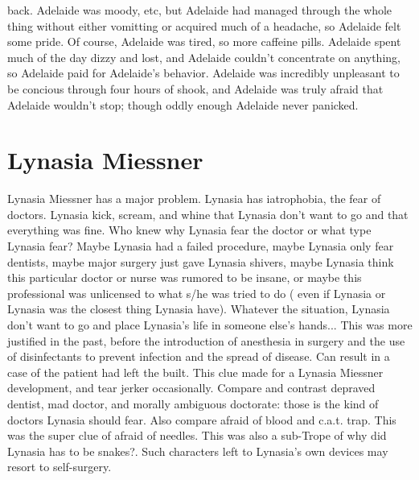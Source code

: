 \documentclass[12pt]{book}
\begin{document}
back. Adelaide was moody, etc, but Adelaide had managed through the whole thing without either vomitting or acquired much of a headache, so Adelaide felt some pride. Of course, Adelaide was tired, so more caffeine pills. Adelaide spent much of the day dizzy and lost, and Adelaide couldn't concentrate on anything, so Adelaide paid for Adelaide's behavior. Adelaide was incredibly unpleasant to be concious through four hours of shook, and Adelaide was truly afraid that Adelaide wouldn't stop; though oddly enough Adelaide never panicked.



\chapter{Lynasia Miessner}

Lynasia Miessner has a major problem. Lynasia has iatrophobia, the fear of doctors. Lynasia kick, scream, and whine that Lynasia don't want to go and that everything was fine. Who knew why Lynasia fear the doctor or what type Lynasia fear? Maybe Lynasia had a failed procedure, maybe Lynasia only fear dentists, maybe major surgery just gave Lynasia shivers, maybe Lynasia think this particular doctor or nurse was rumored to be insane, or maybe this professional was unlicensed to what s/he was tried to do ( even if Lynasia or Lynasia was the closest thing Lynasia have). Whatever the situation, Lynasia don't want to go and place Lynasia's life in someone else's hands... This was more justified in the past, before the introduction of anesthesia in surgery and the use of disinfectants to prevent infection and the spread of disease. Can result in a case of the patient had left the built. This clue made for a Lynasia Miessner development, and tear jerker occasionally. Compare and contrast depraved dentist, mad doctor, and morally ambiguous doctorate: those is the kind of doctors Lynasia should fear. Also compare afraid of blood and c.a.t. trap. This was the super clue of afraid of needles. This was also a sub-Trope of why did Lynasia has to be snakes?. Such characters left to Lynasia's own devices may resort to self-surgery.
\end{document}
